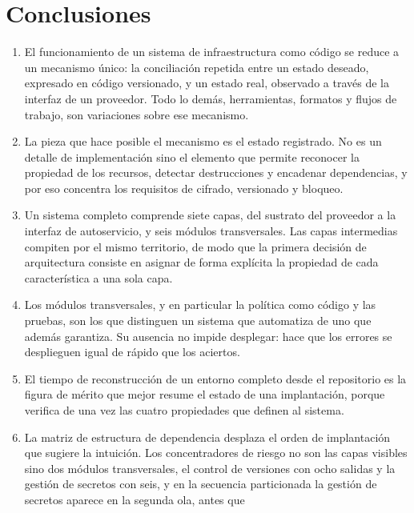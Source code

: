 \documentclass[11pt,letterpaper]{article}
\begin{document}
\section{Conclusiones}
\label{sec:conclusiones}

\begin{enumerate}
  \item El funcionamiento de un sistema de infraestructura como código se
    reduce a un mecanismo único: la conciliación repetida entre un estado
    deseado, expresado en código versionado, y un estado real, observado a
    través de la interfaz de un proveedor. Todo lo demás, herramientas,
    formatos y flujos de trabajo, son variaciones sobre ese mecanismo.
  \item La pieza que hace posible el mecanismo es el estado registrado. No es
    un detalle de implementación sino el elemento que permite reconocer la
    propiedad de los recursos, detectar destrucciones y encadenar dependencias,
    y por eso concentra los requisitos de cifrado, versionado y bloqueo.
  \item Un sistema completo comprende siete capas, del sustrato del proveedor
    a la interfaz de autoservicio, y seis módulos transversales. Las capas
    intermedias compiten por el mismo territorio, de modo que la primera
    decisión de arquitectura consiste en asignar de forma explícita la
    propiedad de cada característica a una sola capa.
  \item Los módulos transversales, y en particular la política como código y
    las pruebas, son los que distinguen un sistema que automatiza de uno que
    además garantiza. Su ausencia no impide desplegar: hace que los errores se
    desplieguen igual de rápido que los aciertos.
  \item El tiempo de reconstrucción de un entorno completo desde el
    repositorio es la figura de mérito que mejor resume el estado de una
    implantación, porque verifica de una vez las cuatro propiedades que
    definen al sistema.
  \item La matriz de estructura de dependencia desplaza el orden de
    implantación que sugiere la intuición. Los concentradores de riesgo no son
    las capas visibles sino dos módulos transversales, el control de versiones
    con ocho salidas y la gestión de secretos con seis, y en la secuencia
    particionada la gestión de secretos aparece en la segunda ola, antes que

\end{enumerate}
\end{document}
